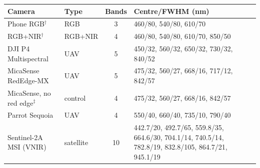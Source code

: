 \begin{tabular}{@{}llcp{7.2cm}@{}}
\toprule
Camera & Type & Bands & Centre/FWHM (nm) \\
\midrule
Phone RGB$^\dagger$ & RGB & 3 & \footnotesize 460/80, 540/80, 610/70 \\
RGB+NIR$^\dagger$ & RGB+NIR & 4 & \footnotesize 460/80, 540/80, 610/70, 850/50 \\
DJI P4 Multispectral & UAV & 5 & \footnotesize 450/32, 560/32, 650/32, 730/32, 840/52 \\
MicaSense RedEdge-MX & UAV & 5 & \footnotesize 475/32, 560/27, 668/16, 717/12, 842/57 \\
MicaSense, no red edge$^\ddagger$ & control & 4 & \footnotesize 475/32, 560/27, 668/16, 842/57 \\
Parrot Sequoia & UAV & 4 & \footnotesize 550/40, 660/40, 735/10, 790/40 \\
Sentinel-2A MSI (VNIR) & satellite & 10 & \footnotesize 442.7/20, 492.7/65, 559.8/35, 664.6/30, 704.1/14, 740.5/14, 782.8/19, 832.8/105, 864.7/21, 945.1/19 \\
\bottomrule
\end{tabular}
